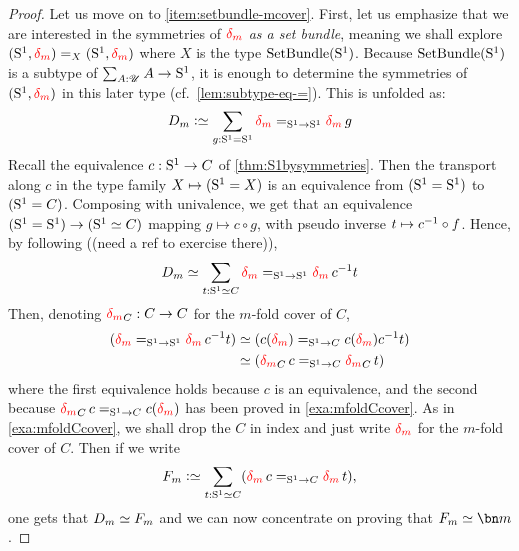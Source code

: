 \begin{proof}
  \def\mono{\hookrightarrow}%
  \def\bigetop#1{\overetop{#1}}%
  \def\bigptoe#1{\widetilde{#1}}%
  \def\myq{\mathfrak m}%
  \def\bigetop#1{{#1}}%
  \def\bigptoe#1{{#1}}%
  \def\etop#1{{#1}}%
  \def\ptoe#1{{#1}}%
  Let us move on to \ref{item:setbundle-mcover}. %
  First, let us emphasize that we are interested in the symmetries of
  $\dg{m}$ \emph{as a set bundle}, meaning we shall explore
  $(\Sc,\dg{m}) =_X (\Sc,\dg{m})$ where $X$ is the type
  $\mathrm{SetBundle}({\mathrm{S}^1})$.
  Because $\mathrm{SetBundle}({\mathrm{S}^1})$ is a subtype of $\sum_{A:{\mathscr{U}}}A\to {\mathrm{S}^1}$, it
  is enough to determine the symmetries of $(\Sc,\dg{m})$ in this later
  type (cf.\ \cref{lem:subtype-eq-=}). This is unfolded as:
  \begin{displaymath}
    D_m \defequi \sum_{g:\Sc = \Sc}\dg{m} =_{\Sc \to \Sc} \dg{m}\ptoe g 
  \end{displaymath}
  Recall the equivalence $c: {\mathrm{S}^1} \to C$ of
  \cref{thm:S1bysymmetries}. Then the transport along $\etop c$ in the
  type family $X\mapsto ({\mathrm{S}^1}=X)$ is an equivalence from $({\mathrm{S}^1} = {\mathrm{S}^1})$
  to $({\mathrm{S}^1} = C)$. Composing with univalence, we get that an
  equivalence $({\mathrm{S}^1}={\mathrm{S}^1}) \to ({\mathrm{S}^1} \simeq C)$ mapping
  $g\mapsto c\circ \ptoe g$, with pseudo inverse
  $t \mapsto \bigetop{\inv c \circ f}$. Hence, by following ((need a
  ref to exercise there)),
  \begin{displaymath}
    D_m \weq  \sum_{t:\Sc \weq C} \dg{m} =_{\Sc\to \Sc} \dg{m}\inv c t
  \end{displaymath}
  Then, denoting $\dg{m}_C: C \to C$ for the $m$-fold cover of $C$,
  \begin{displaymath}
    \begin{split}
      (\dg{m} =_{\Sc\to \Sc} \dg{m}\inv c t) %
      &\weq (c (\dg{m}) =_{\Sc\to C} c (\dg{m}) \inv c t)
      \\
      &\weq (\dg{m}_Cc =_{\Sc\to C} \dg{m}_C t)
    \end{split}
  \end{displaymath}
  where the first equivalence holds because $c$ is an equivalence, and
  the second because $\dg{m}_Cc =_{\Sc\to C} c (\dg{m})$ has been
  proved in \cref{exa:mfoldCcover}. As in \cref{exa:mfoldCcover}, we
  shall drop the $C$ in index and just write $\dg{m}$ for the
  $m$-fold cover of $C$. Then if we write
  \begin{displaymath}
    F_m \defequi \sum_{t:\Sc \weq C}(\dg{m}c =_{\Sc\to C} \dg{m} t),
  \end{displaymath}
  one gets that $D_m \simeq F_m$ and we can now concentrate on proving that
  $F_m \weq \bn m$.


\end{proof}

